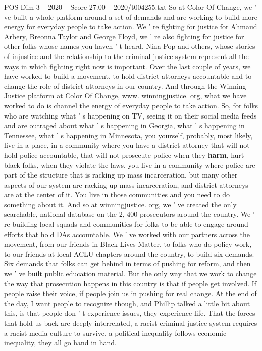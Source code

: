 \begin{textsample}{POS Dim 3 – 2020 – Score 27.00 – 2020/t004255.txt}
So at Color Of Change, we ' ve built a whole platform around a set of demands and are working to build more energy for everyday people to take action.
We ' re fighting for justice for Ahmaud Arbery, Breonna Taylor and George Floyd, we ' re also fighting for justice for other folks whose names you haven ' t heard, Nina Pop and others, whose stories of injustice and the relationship to the criminal justice system represent all the ways in which fighting right now is important.
Over the last couple of years, we have worked to build a movement, to hold district attorneys accountable and to change the role of district attorneys in our country.
And through the Winning Justice platform at Color Of Change, www. winningjustice. org, what we have worked to do is channel the energy of everyday people to take action.
So, for folks who are watching what ' s happening on TV, seeing it on their social media feeds and are outraged about what ' s happening in Georgia, what ' s happening in Tennessee, what ' s happening in Minnesota, you yourself, probably, most likely, live in a place, in a community where you have a district attorney that will not hold police accountable, that will not prosecute police when they \textbf{harm}, hurt black folks, when they violate the laws, you live in a community where police are part of the structure that is racking up mass incarceration, but many other aspects of our system are racking up mass incarceration, and district attorneys are at the center of it.
You live in those communities and you need to do something about it.
And so at winningjustice. org, we ' ve created the only searchable, national database on the 2, 400 prosecutors around the country.
We ' re building local squads and communities for folks to be able to engage around efforts that hold DAs accountable.
We ' ve worked with our partners across the movement, from our friends in Black Lives Matter, to folks who do policy work, to our friends at local ACLU chapters around the country, to build six demands.
Six demands that folks can get behind in terms of pushing for reform, and then we ' ve built public education material.
But the only way that we work to change the way that prosecution happens in this country is that if people get involved.
If people raise their voice, if people join us in pushing for real change.
At the end of the day, I want people to recognize though, and Phillip talked a little bit about this, is that people don ' t experience issues, they experience life.
That the forces that hold us back are deeply interrelated, a racist criminal justice system requires a racist media culture to survive, a political inequality follows economic inequality, they all go hand in hand.

\end{textsample}
